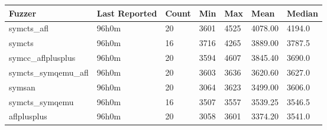 
\begin{table*}[h]
\centering
\begin{tabular}{|l|l|l|l|l|l|l|}
\hline
\textbf{Fuzzer} & \textbf{Last Reported} & \textbf{Count} & \textbf{Min} & \textbf{Max} & \textbf{Mean} & \textbf{Median} \\
\hline
symcts\_afl        & 96h0m              & 20     & 3601  & 4525  & 4078.00       & 4194.0     \\
symcts             & 96h0m              & 16     & 3716  & 4265  & 3889.00       & 3787.5     \\
symcc\_aflplusplus & 96h0m              & 20     & 3594  & 4607  & 3845.40       & 3690.0     \\
symcts\_symqemu\_afl & 96h0m              & 20     & 3603  & 3636  & 3620.60       & 3627.0     \\
symsan             & 96h0m              & 20     & 3064  & 3623  & 3499.00       & 3606.0     \\
symcts\_symqemu    & 96h0m              & 16     & 3507  & 3557  & 3539.25       & 3546.5     \\
aflplusplus        & 96h0m              & 20     & 3058  & 3601  & 3374.20       & 3541.0     \\
\hline
\end{tabular}
\end{table*}